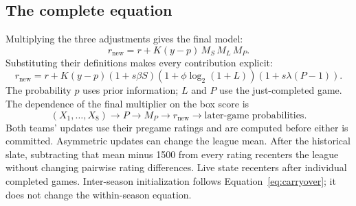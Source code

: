 \documentclass[11pt]{article}
\begin{document}
\subsection{The complete equation}
Multiplying the three adjustments gives the final model:
\begin{equation}\label{eq:update}
 \boxed{r_{\mathrm{new}}=r+K(y-p)\,M_S\,M_L\,M_P}.
\end{equation}
Substituting their definitions makes every contribution explicit:
\begin{equation}\label{eq:update-expanded}
 \boxed{r_{\mathrm{new}}=r+K(y-p)
 (1+s\beta S)(1+\phi\log_2(1+L))(1+s\lambda(P-1))}.
\end{equation}
The probability $p$ uses prior information; $L$ and $P$ use the just-completed
game. The dependence of the final multiplier on the box score is
\begin{equation}
 (X_1,\ldots,X_8)\longrightarrow P\longrightarrow M_P
 \longrightarrow r_{\mathrm{new}}\longrightarrow
 \text{later-game probabilities}.
\end{equation}
Both teams' updates use their pregame ratings and are computed before either
is committed. Asymmetric updates can change the league mean. After the
historical slate, subtracting that mean minus 1500 from every rating recenters
the league without changing pairwise rating differences. Live state recenters
after individual completed games. Inter-season initialization follows
Equation~\eqref{eq:carryover}; it does not change the within-season equation.
\end{document}
